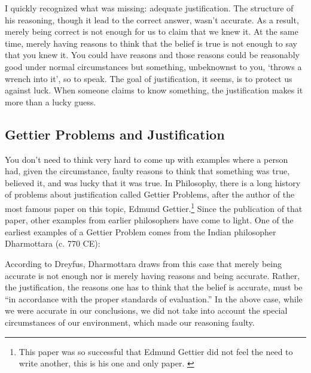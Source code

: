 I quickly recognized what was missing: adequate \gls{justification}. The structure of his reasoning, though it lead to the correct answer, wasn't accurate. As a result, merely being correct is not enough for us to claim that we knew it. At the same time, merely having reasons to think that the belief is true is not enough to say that you knew it. You could have reasons and those reasons could be reasonably good under normal circumstances but something, unbeknownst to you, `throws a wrench into it', so to speak. The goal of justification, it seems, is to protect us against luck. When someone claims to know something, the justification makes it more than a lucky guess.

\subsection{Gettier Problems and Justification}

You don't need to think very hard to come up with examples where a person had, given the circumstance, faulty reasons to think that something was true, believed it, and was lucky that it was true. In Philosophy, there is a long history of problems about justification called Gettier Problems, after the author of the most famous paper on this topic, Edmund Gettier.\footnote{This paper was so successful that Edmund Gettier did not feel the need to write another, this is his one and only paper. \autocite{Gettier1}} Since the publication of that paper, other examples from earlier philosophers have come to light. One of the earliest examples of a Gettier Problem comes from the Indian philosopher Dharmottara (c. 770 CE):


According to Dreyfus, Dharmottara draws from this case that merely being accurate is not enough nor is merely having reasons and being accurate. Rather, the justification, the reasons one has to think that the belief is accurate, must be ``in accordance with the proper standards of evaluation.''\autocite[p. 293]{Dreyfus1} In the above case, while we were accurate in our conclusions, we did not take into account the special circumstances of our environment, which made our reasoning faulty.

